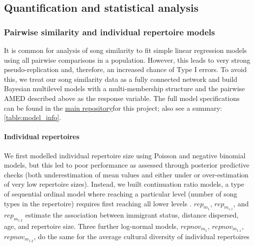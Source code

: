 \subsection{Quantification and statistical analysis}

\subsubsection{Pairwise similarity and individual repertoire models}

It is common for analysis of song similarity to fit simple linear regression models using all pairwise comparisons in a population. However, this leads to very strong pseudo-replication and, therefore, an increased chance of Type I errors. To avoid this, we treat our song similarity data as a fully connected network and build Bayesian multilevel models with a multi-membership structure and the pairwise $\text{AMED}$ described above as the response variable. The full model specifications can be found in the \href{https://github.com/nilomr/birdsong-demography}{main repository}for this project; also see a summary: \autoref{table:model_info}.

\paragraph{Individual repertoires}
We first modelled individual repertoire size using Poisson and negative binomial models, but this led to poor performance as assessed through posterior predictive checks (both underestimation of mean values and either under or over-estimation of very low repertoire sizes). Instead, we built continuation ratio models, a type of sequential ordinal model where reaching a particular level (number of song types in the repertoire) requires first reaching all lower levels \parencite{chambers2023, warti2020}. $rep_{m_1}$, $rep_{m_{1.1}}$, and $rep_{m_{1.2}}$ estimate the association between immigrant status, distance dispersed, age, and repertoire size. Three further log-normal models, $repnov_{m_1}$, $repnov_{m_{1.1}}$, $repnov_{m_{1.2}}$, do the same for the average cultural diversity of individual repertoires

